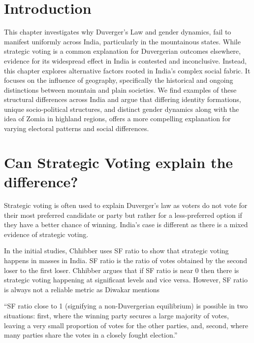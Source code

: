 \section{Introduction}
\begin{sloppypar}

This chapter investigates why Duverger’s Law and gender dynamics, fail to manifest uniformly across India, particularly in the mountainous states. While strategic voting is a common explanation for Duvergerian outcomes elsewhere, evidence for its widespread effect in India is contested and inconclusive. Instead, this chapter explores alternative factors rooted in India’s complex social fabric. It focuses on the  influence of geography, specifically the historical and ongoing distinctions between mountain and plain societies. We find examples of these structural differences across India and argue that differing identity formations, unique socio\hyp{}political structures, and distinct gender dynamics along with the idea of Zomia in highland regions, offers a more compelling explanation for varying electoral patterns and social differences. 

\end{sloppypar}
\section{Can Strategic Voting explain the difference?}

Strategic voting is often used to explain Duverger’s law as voters do not vote for their most preferred candidate or party but rather for a less\hyp{}preferred option if they have a better chance of winning. India’s case is different as there is a mixed evidence of strategic voting. 

\vspace{0.3cm}

In the initial studies, Chhibber uses SF ratio to show that strategic voting happens in masses in India. SF ratio is the ratio of votes obtained by the second loser to the first loser. Chhibber argues that if SF ratio is near 0 then there is strategic voting happening at significant levels and vice versa. However, SF ratio is always not a reliable metric as Diwakar mentions 

\vspace{0.3cm}

“SF ratio close to 1 (signifying a non\hyp{}Duvergerian equilibrium) is possible in two situations: first, where the winning party secures a large majority of votes, leaving a very small proportion of votes for the other parties, and, second, where many parties share the votes in a closely fought election.”

